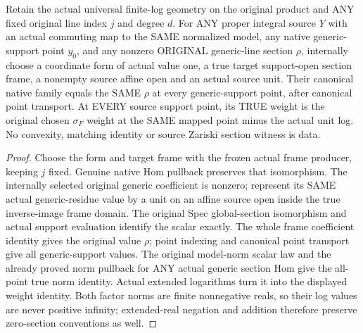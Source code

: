 \begin{theorem}
\label{thm:intrinsic-numerical-original-model-native-rational-gauge}
\leanok
{}
Retain the actual universal finite-log geometry on the original product and
ANY fixed original line index $j$ and degree $d$. For ANY proper integral
source $Y$ with an actual commuting map to the SAME normalized model, any
native generic-support point $y_0$, and any nonzero ORIGINAL generic-line
section $\rho$, internally choose a coordinate form of actual value one,
a true target support-open section frame, a nonempty source affine open
and an actual source unit. Their canonical native family equals the SAME
$\rho$ at every generic-support point, after canonical point transport.
At EVERY source support point, its TRUE weight is the original chosen
$\sigma_F$ weight at the SAME mapped point minus the actual unit log.
No convexity, matching identity or source Zariski section witness is data.
\end{theorem}
\begin{proof}
Choose the form and target frame with the frozen actual frame producer,
keeping $j$ fixed. Genuine native Hom pullback preserves that isomorphism.
The internally selected original generic coefficient is nonzero; represent
its SAME actual generic-residue value by a unit on an affine source open
inside the true inverse-image frame domain. The original Spec global-section
isomorphism and actual support evaluation identify the scalar exactly.
The whole frame coefficient identity gives the original value $\rho$;
point indexing and canonical point transport give all generic-support
values. The original model-norm scalar law and the already proved norm
pullback for ANY actual generic section Hom give the all-point true norm
identity. Actual extended logarithms turn it into the displayed weight
identity. Both factor norms are finite nonnegative reals, so their log
values are never positive infinity; extended-real negation and addition
therefore preserve zero-section conventions as well.
\end{proof}


